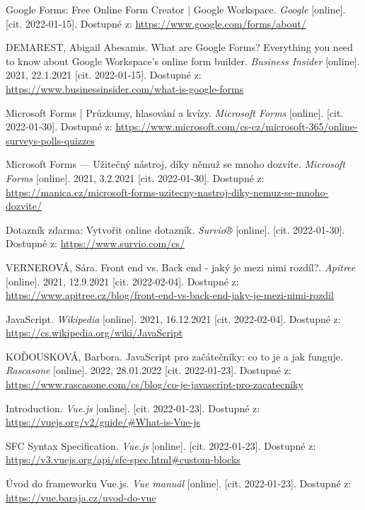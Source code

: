 \begin{thebibliography}{55}

Google Forms: Free Online Form Creator | Google Workspace. \textit{Google} [online]. [cit. 2022-01-15]. Dostupné z: \url{https://www.google.com/forms/about/}

DEMAREST, Abigail Abesamis. What are Google Forms? Everything you need to know about Google Workspace's online form builder. \textit{Business Insider} [online]. 2021, 22.1.2021 [cit. 2022-01-15]. Dostupné z: \url{https://www.businessinsider.com/what-is-google-forms}

Microsoft Forms | Průzkumy, hlasování a kvízy. \textit{Microsoft Forms} [online]. [cit. 2022-01-30]. Dostupné z: \url{https://www.microsoft.com/cs-cz/microsoft-365/online-surveys-polls-quizzes}

Microsoft Forms --- Užitečný nástroj, díky němuž se mnoho dozvíte. \textit{Microsoft Forms} [online]. 2021, 3.2.2021 [cit. 2022-01-30]. Dostupné z: \url{https://manica.cz/microsoft-forms-uzitecny-nastroj-diky-nemuz-se-mnoho-dozvite/}

Dotazník zdarma: Vytvořit online dotazník. \textit{Survio®} [online]. [cit. 2022-01-30]. Dostupné z: \url{https://www.survio.com/cs/}

VERNEROVÁ, Sára. Front end vs. Back end - jaký je mezi nimi rozdíl?. \textit{Apitree} [online]. 2021, 12.9.2021 [cit. 2022-02-04]. Dostupné z: \url{https://www.apitree.cz/blog/front-end-vs-back-end-jaky-je-mezi-nimi-rozdil}

JavaScript. \textit{Wikipedia} [online]. 2021, 16.12.2021 [cit. 2022-02-04]. Dostupné z: \url{https://cs.wikipedia.org/wiki/JavaScript}

KOĎOUSKOVÁ, Barbora. JavaScript pro začátečníky: co to je a jak funguje. \textit{Rascasone} [online]. 2022, 28.01.2022 [cit. 2022-01-23]. Dostupné z: \url{https://www.rascasone.com/cs/blog/co-je-javascript-pro-zacatecniky}

Introduction. \textit{Vue.js} [online]. [cit. 2022-01-23]. Dostupné z: \url{https://vuejs.org/v2/guide/\#What-is-Vue-js}

SFC Syntax Specification. \textit{Vue.js} [online]. [cit. 2022-01-23]. Dostupné z: \url{https://v3.vuejs.org/api/sfc-spec.html\#custom-blocks}

Úvod do frameworku Vue.js. \textit{Vue manuál} [online]. [cit. 2022-01-23]. Dostupné z: \url{https://vue.baraja.cz/uvod-do-vue}


\end{thebibliography}

